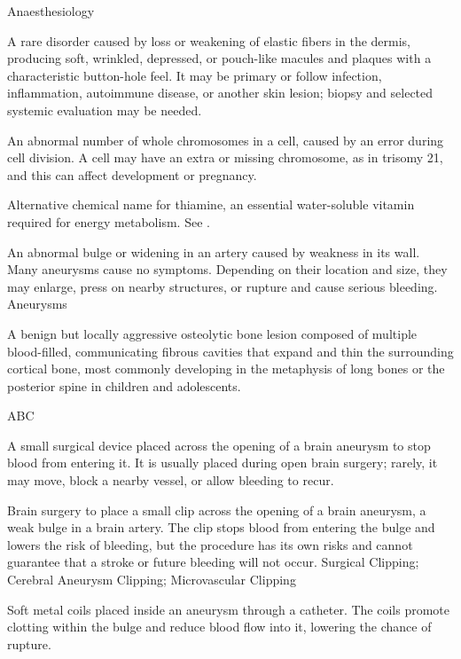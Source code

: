 \synonyms
Anaesthesiology

 A rare disorder caused by loss or weakening of elastic fibers in the dermis, producing soft, wrinkled, depressed, or pouch-like macules and plaques with a characteristic button-hole feel. It may be primary or follow infection, inflammation, autoimmune disease, or another skin lesion; biopsy and selected systemic evaluation may be needed.

 An abnormal number of whole chromosomes in a cell, caused by an error during cell division. A cell may have an extra or missing chromosome, as in trisomy 21, and this can affect development or pregnancy.

 Alternative chemical name for thiamine, an essential water-soluble vitamin required for energy metabolism. See .

 An abnormal bulge or widening in an artery caused by weakness in its wall. Many aneurysms cause no symptoms. Depending on their location and size, they may enlarge, press on nearby structures, or rupture and cause serious bleeding.
\synonyms
Aneurysms

 A benign but locally aggressive osteolytic bone lesion composed of multiple blood-filled, communicating fibrous cavities that expand and thin the surrounding cortical bone, most commonly developing in the metaphysis of long bones or the posterior spine in children and adolescents.

\synonyms
ABC

 A small surgical device placed across the opening of a brain aneurysm to stop blood from entering it. It is usually placed during open brain surgery; rarely, it may move, block a nearby vessel, or allow bleeding to recur.

 Brain surgery to place a small clip across the opening of a brain aneurysm, a weak bulge in a brain artery. The clip stops blood from entering the bulge and lowers the risk of bleeding, but the procedure has its own risks and cannot guarantee that a stroke or future bleeding will not occur.
\synonyms
Surgical Clipping; Cerebral Aneurysm Clipping; Microvascular Clipping

 Soft metal coils placed inside an aneurysm through a catheter. The coils promote clotting within the bulge and reduce blood flow into it, lowering the chance of rupture.

